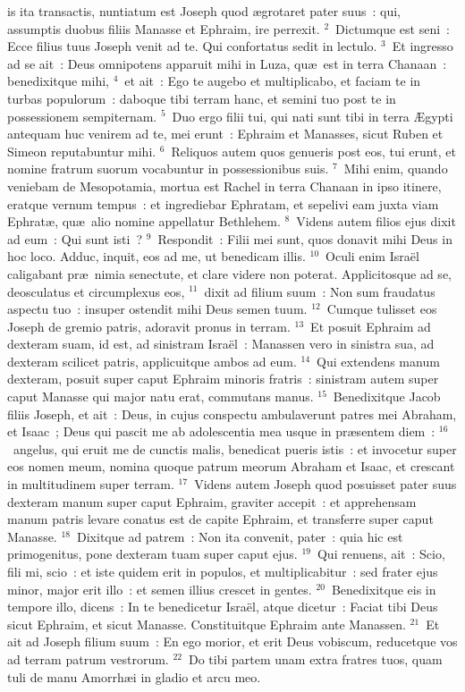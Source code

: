 \bchapter
{}is ita transactis, nuntiatum est Joseph quod \ae grotaret pater suus~: qui, assumptis duobus filiis Manasse et Ephraim, ire perrexit.
${}^{2}$~Dictumque est seni~: Ecce filius tuus Joseph venit ad te. Qui confortatus sedit in lectulo.
${}^{3}$~Et ingresso ad se ait~: Deus omnipotens apparuit mihi in Luza, qu\ae\ est in terra Chanaan~: benedixitque mihi,
${}^{4}$~et ait~: Ego te augebo et multiplicabo, et faciam te in turbas populorum~: daboque tibi terram hanc, et semini tuo post te in possessionem sempiternam.
${}^{5}$~Duo ergo filii tui, qui nati sunt tibi in terra \AE gypti antequam huc venirem ad te, mei erunt~: Ephraim et Manasses, sicut Ruben et Simeon reputabuntur mihi.
${}^{6}$~Reliquos autem quos genueris post eos, tui erunt, et nomine fratrum suorum vocabuntur in possessionibus suis.
${}^{7}$~Mihi enim, quando veniebam de Mesopotamia, mortua est Rachel in terra Chanaan in ipso itinere, eratque vernum tempus~: et ingrediebar Ephratam, et sepelivi eam juxta viam Ephrat\ae , qu\ae\ alio nomine appellatur Bethlehem.
${}^{8}$~Videns autem filios ejus dixit ad eum~: Qui sunt isti~?
${}^{9}$~Respondit~: Filii mei sunt, quos donavit mihi Deus in hoc loco. Adduc, inquit, eos ad me, ut benedicam illis.
${}^{10}$~Oculi enim Isra\"el caligabant pr\ae\ nimia senectute, et clare videre non poterat. Applicitosque ad se, deosculatus et circumplexus eos,
${}^{11}$~dixit ad filium suum~: Non sum fraudatus aspectu tuo~: insuper ostendit mihi Deus semen tuum.
${}^{12}$~Cumque tulisset eos Joseph de gremio patris, adoravit pronus in terram.
${}^{13}$~Et posuit Ephraim ad dexteram suam, id est, ad sinistram Isra\"el~: Manassen vero in sinistra sua, ad dexteram scilicet patris, applicuitque ambos ad eum.
${}^{14}$~Qui extendens manum dexteram, posuit super caput Ephraim minoris fratris~: sinistram autem super caput Manasse qui major natu erat, commutans manus.
${}^{15}$~Benedixitque Jacob filiis Joseph, et ait~: Deus, in cujus conspectu ambulaverunt patres mei Abraham, et Isaac~; Deus qui pascit me ab adolescentia mea usque in pr\ae sentem diem~:
${}^{16}$~angelus, qui eruit me de cunctis malis, benedicat pueris istis~: et invocetur super eos nomen meum, nomina quoque patrum meorum Abraham et Isaac, et crescant in multitudinem super terram.
${}^{17}$~Videns autem Joseph quod posuisset pater suus dexteram manum super caput Ephraim, graviter accepit~: et apprehensam manum patris levare conatus est de capite Ephraim, et transferre super caput Manasse.
${}^{18}$~Dixitque ad patrem~: Non ita convenit, pater~: quia hic est primogenitus, pone dexteram tuam super caput ejus.
${}^{19}$~Qui renuens, ait~: Scio, fili mi, scio~: et iste quidem erit in populos, et multiplicabitur~: sed frater ejus minor, major erit illo~: et semen illius crescet in gentes.
${}^{20}$~Benedixitque eis in tempore illo, dicens~: In te benedicetur Isra\"el, atque dicetur~: Faciat tibi Deus sicut Ephraim, et sicut Manasse. Constituitque Ephraim ante Manassen.
${}^{21}$~Et ait ad Joseph filium suum~: En ego morior, et erit Deus vobiscum, reducetque vos ad terram patrum vestrorum.
${}^{22}$~Do tibi partem unam extra fratres tuos, quam tuli de manu Amorrh\ae i in gladio et arcu meo.

